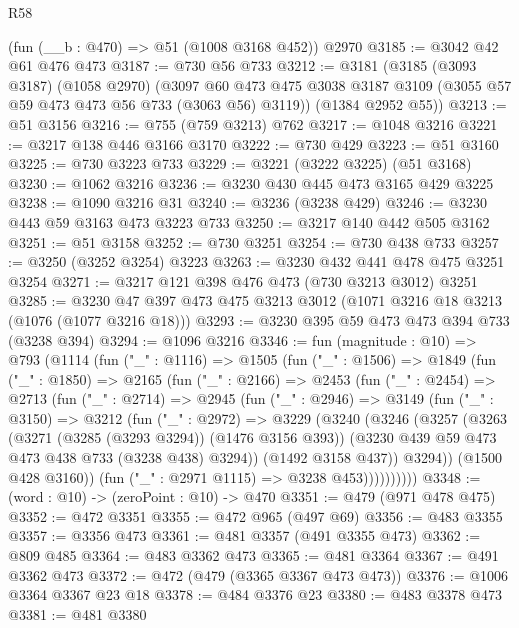 \begin{lexlean}{R58}
\begin{coremodule}
    (fun (__b : @470) => @51 (@1008 @3168 @452))
    @2970
@3185 := @3042 @42 @61 @476 @473
@3187 := @730 @56 @733
@3212 := @3181
    (@3185
      (@3093 @3187)
      (@1058 @2970)
      (@3097 @60 @473 @475 @3038 @3187 @3109 (@3055 @57 @59 @473 @473 @56 @733 (@3063 @56) @3119))
      (@1384 @2952 @55))
@3213 := @51 @3156
@3216 := @755 (@759 @3213) @762
@3217 := @1048 @3216
@3221 := @3217 @138 @446 @3166 @3170
@3222 := @730 @429
@3223 := @51 @3160
@3225 := @730 @3223 @733
@3229 := @3221 (@3222 @3225) (@51 @3168)
@3230 := @1062 @3216
@3236 := @3230 @430 @445 @473 @3165 @429 @3225
@3238 := @1090 @3216 @31
@3240 := @3236 (@3238 @429)
@3246 := @3230 @443 @59 @3163 @473 @3223 @733
@3250 := @3217 @140 @442 @505 @3162
@3251 := @51 @3158
@3252 := @730 @3251
@3254 := @730 @438 @733
@3257 := @3250 (@3252 @3254) @3223
@3263 := @3230 @432 @441 @478 @475 @3251 @3254
@3271 := @3217 @121 @398 @476 @473 (@730 @3213 @3012) @3251
@3285 := @3230 @47 @397 @473 @475 @3213 @3012 (@1071 @3216 @18 @3213 (@1076 (@1077 @3216 @18)))
@3293 := @3230 @395 @59 @473 @473 @394 @733 (@3238 @394)
@3294 := @1096 @3216
@3346 := fun (magnitude : @10) =>
  @793
    (@1114
      (fun ("_" : @1116) =>
      @1505
        (fun ("_" : @1506) =>
        @1849
          (fun ("_" : @1850) =>
          @2165
            (fun ("_" : @2166) =>
            @2453
              (fun ("_" : @2454) =>
              @2713
                (fun ("_" : @2714) =>
                @2945
                  (fun ("_" : @2946) =>
                  @3149
                    (fun ("_" : @3150) =>
                    @3212
                      (fun ("_" : @2972) =>
                      @3229
                        (@3240
                          (@3246
                            (@3257
                              (@3263
                                (@3271 (@3285 (@3293 @3294)) (@1476 @3156 @393))
                                (@3230 @439 @59 @473 @473 @438 @733 (@3238 @438) @3294))
                              (@1492 @3158 @437))
                            @3294))
                        (@1500 @428 @3160))
                      (fun ("_" : @2971 @1115) => @3238 @453))))))))))
@3348 := (word : @10) -> (zeroPoint : @10) -> @470
@3351 := @479 (@971 @478 @475)
@3352 := @472 @3351
@3355 := @472 @965 (@497 @69)
@3356 := @483 @3355
@3357 := @3356 @473
@3361 := @481 @3357 (@491 @3355 @473)
@3362 := @809 @485
@3364 := @483 @3362 @473
@3365 := @481 @3364
@3367 := @491 @3362 @473
@3372 := @472 (@479 (@3365 @3367 @473 @473))
@3376 := @1006 @3364 @3367 @23 @18
@3378 := @484 @3376 @23
@3380 := @483 @3378 @473
@3381 := @481 @3380

\end{coremodule}
\end{lexlean}
